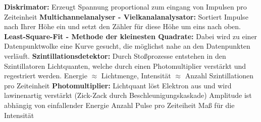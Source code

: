 \textbf{Diskrimator:} Erzeugt Spannung proportional zum eingang von Impulsen pro Zeiteinheit
\textbf{Multichannelanalyser - Vielkanalanalysator:} Sortiert Impulse nach Ihrer Höhe ein und setzt den Zähler für diese Höhe um eins nach oben.
\textbf{Least-Square-Fit - Methode der kleinesten Quadrate:} Dabei wird zu einer Datenpunktwolke eine Kurve gesucht, die möglichst nahe an den Datenpunkten verläuft.
\textbf{Szintillationsdetektor:} Durch Stoßprozesse entstehen in den Szintillatoren Lichtquanten, welche durch einen Photomultiplier verstärkt und regestriert werden. Energie $\approx$ Lichtmenge, Intensität $\approx$ Anzahl Szintillationen pro Zeiteinheit 
\textbf{Photomultiplier:} Lichtquant löst Elektron aus und wird lawinenartig verstärkt (Zick-Zack durch Beschleunigungskaskade) Amplitude ist abhängig von einfallender Energie
Anzahl Pulse pro Zeiteiheit Maß für die Intensität
